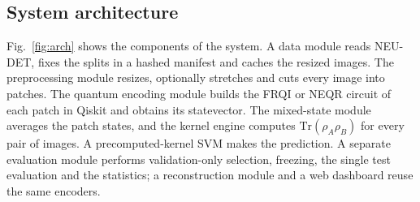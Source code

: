 \documentclass[12pt,onecolumn,draftclsnofoot]{IEEEtran}
\begin{document}
\subsection{System architecture}
Fig.~\ref{fig:arch} shows the components of the system. A data module reads NEU-DET, fixes the splits in a hashed manifest and caches the resized images. The preprocessing module resizes, optionally stretches and cuts every image into patches. The quantum encoding module builds the FRQI or NEQR circuit of each patch in Qiskit \cite{qiskit2024} and obtains its statevector. The mixed-state module averages the patch states, and the kernel engine computes $\mathrm{Tr}(\rho_A\rho_B)$ for every pair of images. A precomputed-kernel SVM makes the prediction. A separate evaluation module performs validation-only selection, freezing, the single test evaluation and the statistics; a reconstruction module and a web dashboard reuse the same encoders.
\end{document}
